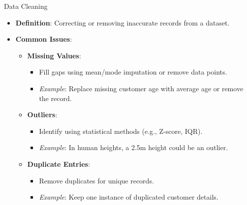 \documentclass[aspectratio=169]{beamer}
\begin{document}
\begin{frame}[fragile]{Data Cleaning}
    \begin{itemize}
        \item \textbf{Definition}: Correcting or removing inaccurate records from a dataset.
        \item \textbf{Common Issues}:
            \begin{itemize}
                \item \textbf{Missing Values}:
                    \begin{itemize}
                        \item Fill gaps using mean/mode imputation or remove data points.
                        \item \textit{Example}: Replace missing customer age with average age or remove the record.
                    \end{itemize}
                \item \textbf{Outliers}:
                    \begin{itemize}
                        \item Identify using statistical methods (e.g., Z-score, IQR).
                        \item \textit{Example}: In human heights, a 2.5m height could be an outlier.
                    \end{itemize}
                \item \textbf{Duplicate Entries}:
                    \begin{itemize}
                        \item Remove duplicates for unique records.
                        \item \textit{Example}: Keep one instance of duplicated customer details.
                    \end{itemize}
            \end{itemize}
    \end{itemize}
\end{frame}
\end{document}
